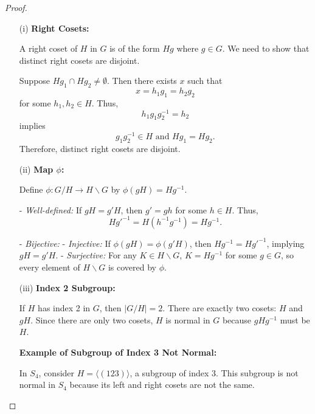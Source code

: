 \documentclass{article}
\begin{document}
\begin{proof}
    \begin{enumerate}
        \item[(i)] 
        \textbf{Right Cosets:}
        
        A right coset of \( H \) in \( G \) is of the form \( H g \) where \( g \in G \). We need to show that distinct right cosets are disjoint. 
    
        Suppose \( H g_1 \cap H g_2 \neq \emptyset \). Then there exists \( x \) such that
        \[
        x = h_1 g_1 = h_2 g_2
        \]
        for some \( h_1, h_2 \in H \). Thus,
        \[
        h_1 g_1 g_2^{-1} = h_2
        \]
        implies
        \[
        g_1 g_2^{-1} \in H \text{ and } H g_1 = H g_2.
        \]
        Therefore, distinct right cosets are disjoint.
    
        \item[(ii)] 
        \textbf{Map \( \phi \):}
        
        Define \( \phi: G/H \to H \backslash G \) by \( \phi(gH) = H g^{-1} \).
    
        - \textit{Well-defined:} If \( gH = g'H \), then \( g' = gh \) for some \( h \in H \). Thus,
        \[
        H g'^{-1} = H (h^{-1} g^{-1}) = H g^{-1}.
        \]
        
        - \textit{Bijective:} 
          - \textit{Injective:} If \( \phi(gH) = \phi(g'H) \), then \( H g^{-1} = H g'^{-1} \), implying \( gH = g'H \).
          - \textit{Surjective:} For any \( K \in H \backslash G \), \( K = H g^{-1} \) for some \( g \in G \), so every element of \( H \backslash G \) is covered by \( \phi \).
    
        \item[(iii)] 
        \textbf{Index 2 Subgroup:}
        
        If \( H \) has index 2 in \( G \), then \( |G/H| = 2 \). There are exactly two cosets: \( H \) and \( gH \). Since there are only two cosets, \( H \) is normal in \( G \) because \( g H g^{-1} \) must be \( H \).
    
        \textbf{Example of Subgroup of Index 3 Not Normal:}
        
        In \( S_4 \), consider \( H = \langle (123) \rangle \), a subgroup of index 3. This subgroup is not normal in \( S_4 \) because its left and right cosets are not the same.
    
    \end{enumerate}
    
\end{proof}
\end{document}
